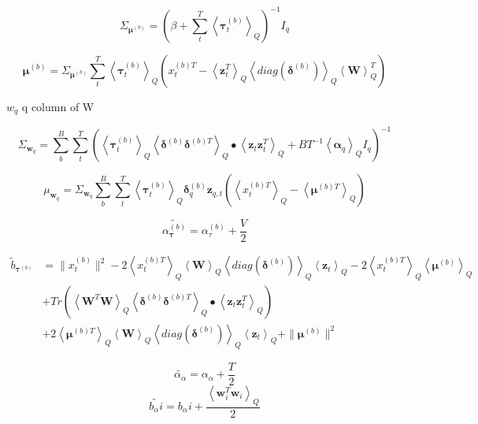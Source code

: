 \documentclass[10pt]{article}
\newcommand{\Angle}[1]{\left \langle #1 \right \rangle}
\newcommand{\Eq}[1]{\Angle{#1}_Q}
\begin{document}
    \begin{equation}
        \Sigma_{\bm{\mu}^{(b)}} = (\beta + \sum_t^T\Eq{\bm{\tau}_t^{(b)}})^{-1} I_q
    \end{equation}

    \begin{equation}
        \bm{\mu}^{(b)} = \Sigma_{\bm{\mu}^{(b)}}\sum_t^T\Eq{\bm{\tau}_t^{(b)}}(x_t^{(b)T} - \Eq{\bm{z}_t^T}\Eq{diag(\bm{\delta}^{(b)})}\Eq{\bm{W}}^{T})
    \end{equation}

    $w_q$ q column of W

    \begin{equation}
        \Sigma_{\bm{w}_q} = \sum_b^B\sum_t^T (\Eq{\bm{\tau}_t^{(b)}}\Eq{\bm{\delta}^{(b)}\bm{\delta}^{(b)T}}\bullet\Eq{\bm{z}_t\bm{z}_t^T} + BT^{-1}\Eq{\bm{\alpha}_q}I_q)^{-1}
    \end{equation}

    \begin{equation}
        \mu_{\bm{w}_q} = \Sigma_{\bm{w}_q}\sum_b^B\sum_t^T\Eq{\bm{\tau}_t^{(b)}}\bm{\delta}^{(b)}_q\bm{z}_{q,t}(\Eq{x_t^{(b)T}} - \Eq{\bm{\mu}^{(b)T}})
    \end{equation}

     \begin{equation}
        \tilde{\alpha_{\bm{\tau}}^{(b)}} = \alpha_{\tau}^{(b)} + \frac{V}{2}
    \end{equation}

    \begin{align}
        \tilde{b}_{\bm{\tau}^{(b)}} &= \|x_t^{(b)}\|^2 - 2\Eq{x_t^{(b)T}}\Eq{\bm{W}}\Eq{diag(\bm{\delta}^{(b)})}\Eq{\bm{z}_t} - 2\Eq{x_t^{(b)T}}\Eq{\bm{\mu}^{(b)}} \nonumber \\
        & + Tr(\Eq{\bm{W}^T\bm{W}}\Eq{\bm{\delta}^{(b)}\bm{\delta}^{(b)T}}\bullet\Eq{\bm{z}_t\bm{z}_t^T})\nonumber \\
        &+ 2 \Eq{\bm{\mu}^{(b)T}}\Eq{\bm{W}}\Eq{diag(\bm{\delta}^{(b)})}\Eq{\bm{z}_t} + \|\bm{\mu}^{(b)}\|^2
    \end{align}

    \begin{equation}
        \tilde{\alpha_{\alpha}} = \alpha_{\alpha} + \frac{T}{2}
    \end{equation}
    \begin{equation}
        \tilde{b_{\alpha}i} = b_{\alpha}i + \frac{\Eq{\bm{w}_i^T\bm{w}_i}}{2}
    \end{equation}

    \newpage
\end{document}
